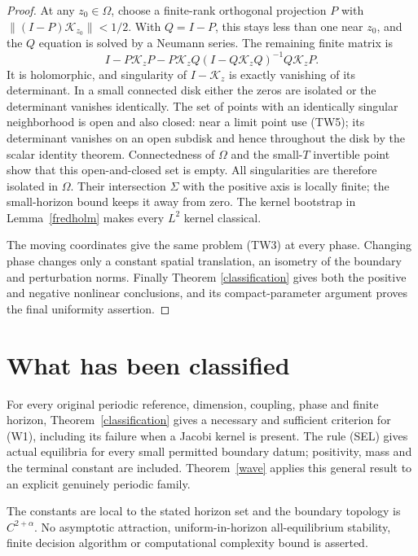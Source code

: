 \documentclass[11pt,a4paper]{article}
\begin{document}
\begin{proof}
At any
$z_0\in\Omega$, choose a finite-rank orthogonal projection $P$
with $\|(I-P)\mathcal K_{z_0}\|<1/2$. With $Q=I-P$, this stays
less than one near $z_0$, and the $Q$ equation is solved by a
Neumann series. The remaining finite matrix is
\begin{equation}\tag{TW5}\label{TW5}
 I-P\mathcal K_zP-P\mathcal K_zQ
       (I-Q\mathcal K_zQ)^{-1}Q\mathcal K_zP.
\end{equation}
It is holomorphic, and singularity of $I-\mathcal K_z$ is exactly
vanishing of its determinant. In a small connected disk either the
zeros are isolated or the determinant vanishes identically.
The set of points with an identically singular neighborhood is open
and also closed: near a limit point use (TW5); its determinant
vanishes on an open subdisk and hence throughout the disk by the
scalar identity theorem. Connectedness of $\Omega$ and the small-$T$
invertible point show that this open-and-closed set is empty.
All singularities are therefore isolated in $\Omega$.
Their intersection $\Sigma$ with the positive axis is locally finite;
the small-horizon bound keeps it away from zero. The kernel bootstrap
in Lemma~\ref{fredholm} makes every $L^2$ kernel classical.

The moving coordinates give the same problem (TW3) at every phase.
Changing phase changes only a constant spatial translation, an
isometry of the boundary and perturbation norms. Finally Theorem
\ref{classification} gives both the positive and negative nonlinear
conclusions, and its compact-parameter argument proves the final
uniformity assertion.
\end{proof}

\section{What has been classified}
For every original periodic reference, dimension, coupling, phase and
finite horizon, Theorem~\ref{classification} gives a necessary and
sufficient criterion for (W1), including its failure when a Jacobi
kernel is present. The rule (SEL) gives actual equilibria for every
small permitted boundary datum; positivity, mass and the terminal
constant are included. Theorem~\ref{wave}
applies this general result to an explicit genuinely periodic family.

The constants are local to the stated horizon set and the boundary
topology is $C^{2+\alpha}$. No asymptotic attraction, uniform-in-horizon
all-equilibrium stability, finite decision algorithm or computational
complexity bound is asserted.
\end{document}

